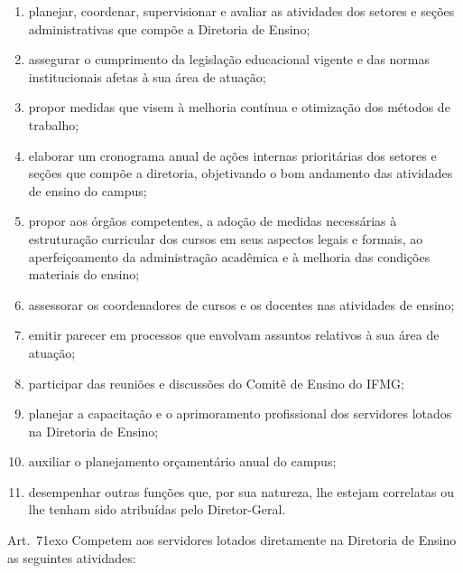 \documentclass[a4paper,12pt]{report}
\newcommand{\ORD}[2]{#1\raise1ex\hbox{\scriptsize#2}}
\begin{document}
\begin{enumerate}
\renewcommand{\labelenumi}{\Roman{enumi}}

\item planejar, coordenar, supervisionar e avaliar as atividades dos setores e seções
      administrativas que compõe a Diretoria de Ensino;

\item assegurar o cumprimento da legislação educacional vigente e das normas institucionais 
      afetas à sua área de atuação;

\item propor medidas que visem à melhoria contínua e otimização dos métodos de trabalho;

\item elaborar um cronograma anual de ações internas prioritárias dos setores e seções que 
      compõe a diretoria, objetivando o bom andamento das atividades de ensino do campus;

\item propor aos órgãos competentes, a adoção de medidas necessárias à estruturação    
      curricular dos cursos em seus aspectos legais e formais, ao aperfeiçoamento da 
      administração acadêmica e à melhoria das condições materiais do ensino;

\item assessorar os coordenadores de cursos e os docentes nas atividades de ensino;

\item emitir parecer em processos que envolvam assuntos relativos à sua área de atuação;

\item participar das reuniões e discussões do Comitê de Ensino do IFMG;

\item planejar a capacitação e o aprimoramento profissional dos servidores lotados na   
      Diretoria de Ensino;

\item auxiliar o planejamento orçamentário anual do campus;

\item desempenhar outras funções que, por sua natureza, lhe estejam correlatas ou lhe  
      tenham sido atribuídas pelo Diretor-Geral.
\end{enumerate}

Art.~\ORD{7}{o} Competem aos servidores lotados diretamente na Diretoria de Ensino as 
seguintes atividades:
\end{document}
